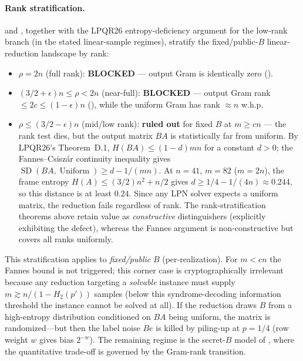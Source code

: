 \documentclass[11pt,a4paper]{article}
\theoremstyle{plain}
\theoremstyle{definition}
\begin{document}
\paragraph{Rank stratification.}  and , together with the LPQR26 entropy-deficiency argument for the low-rank branch (in the stated linear-sample regimes), stratify the fixed/public-$B$ linear-reduction landscape by rank:
\begin{itemize}
\item $\rho = 2n$ (full rank): \textbf{BLOCKED} --- output Gram is identically zero ().
\item $(3/2+\epsilon)n \le \rho < 2n$ (near-full): \textbf{BLOCKED} --- output Gram rank $\le 2c \le (1-\epsilon)n$ (), while the uniform Gram has rank $\approx n$ w.h.p.
\item $\rho \le (3/2-\epsilon)n$ (mid/low rank): \textbf{ruled out} for fixed $B$ at $m \ge cn$ --- the rank test dies, but the output matrix $BA$ is statistically far from uniform. By LPQR26's Theorem~D.1, $H(BA) \le (1-d)mn$ for a constant $d > 0$; the Fannes--Csisz\'{a}r continuity inequality gives $\operatorname{SD}(BA, \operatorname{Uniform}) \ge d - 1/(mn)$. At $n=41$, $m=82$ ($m=2n$), the frame entropy $H(A) \le (3/2)n^2 + n/2$ gives $d \ge 1/4 - 1/(4n) \approx 0.244$, so this distance is at least $0.24$. Since any LPN solver expects a uniform matrix, the reduction fails regardless of rank. The rank-stratification theorems above retain value as \emph{constructive} distinguishers (explicitly exhibiting the defect), whereas the Fannes argument is non-constructive but covers all ranks uniformly.
\end{itemize}
This stratification applies to \emph{fixed/public} $B$ (per-realization). For $m < cn$ the Fannes bound is not triggered; this corner case is cryptographically irrelevant because any reduction targeting a \emph{solvable} instance must supply $m \gtrsim n/(1-H_2(p'))$ samples (below this syndrome-decoding information threshold the instance cannot be solved at all). If the reduction draws $B$ from a high-entropy distribution conditioned on $BA$ being uniform, the matrix is randomized---but then the label noise $Be$ is killed by piling-up at $p=1/4$ (row weight $w$ gives bias $2^{-w}$). The remaining regime is the secret-$B$ model of , where the quantitative trade-off is governed by the Gram-rank transition.
\end{document}
